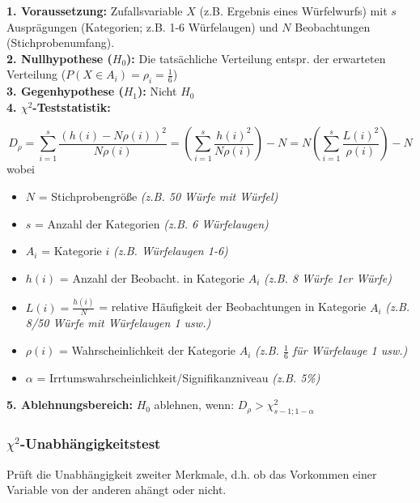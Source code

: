\textbf{1. Voraussetzung:} Zufallsvariable \(X\) (z.B. Ergebnis eines Würfelwurfs) mit \(s\) Ausprägungen 
(Kategorien; z.B. 1-6 Würfelaugen) und \(N\) Beobachtungen (Stichprobenumfang).\\

\textbf{2. Nullhypothese (\(H_0\)):} Die tatsächliche Verteilung entspr. der erwarteten Verteilung (\(P(X \in A_i)=\rho_i=\frac{1}{6}\))\\

\textbf{3. Gegenhypothese (\(H_1\)):} Nicht \(H_0\)\\

\textbf{4. \(\chi^2\)-Teststatistik:}

\begin{equation*}
    D_{\rho} = \sum_{i=1}^{s}\frac{(h(i)-N\rho(i))^2}{N\rho(i)}=\left(\sum_{i=1}^{s}\frac{h(i)^2}{N\rho(i)}\right)-N=N\left(\sum_{i=1}^{s}\frac{L(i)^2}{\rho(i)}\right) - N
\end{equation*}
wobei
\begin{itemize}
    \item \(N\) = Stichprobengröße \emph{(z.B. 50 Würfe mit Würfel)}
    \item \(s\) = Anzahl der Kategorien \emph{(z.B. 6 Würfelaugen)}
    \item \(A_i\) = Kategorie \(i\) \emph{(z.B. Würfelaugen 1-6)}
    \item \(h(i)\) = Anzahl der Beobacht. in Kategorie \(A_i\) \emph{(z.B. 8 Würfe 1er Würfe)}
    \item \(L(i)=\frac{h(i)}{N}\) = relative Häufigkeit der Beobachtungen in Kategorie \(A_i\) \emph{(z.B. 8/50 Würfe mit Würfelaugen 1 usw.)}
    \item \(\rho(i)\) = Wahrscheinlichkeit der Kategorie \(A_i\) \emph{(z.B. \(\frac{1}{6}\) für Würfelauge 1 usw.)}
    \item \(\alpha\) = Irrtumswahrscheinlichkeit/Signifikanzniveau \emph{(z.B. 5\%)}
\end{itemize}

\textbf{5. Ablehnungsbereich:} \(H_0\) ablehnen, wenn:  \(D_{\rho} > \chi^2_{s-1;1-\alpha}\)\\


\subsubsection{\(\chi^2\)-Unabhängigkeitstest}

Prüft die Unabhängigkeit zweiter Merkmale, d.h. ob das Vorkommen einer Variable von der anderen ahängt oder nicht.\\


